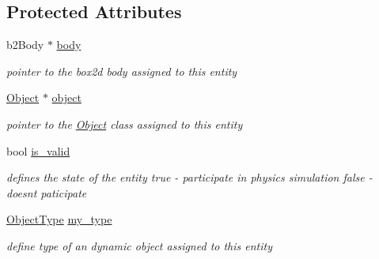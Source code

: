 \subsection*{Protected Attributes}
\begin{DoxyCompactItemize}
\item 
\mbox{\label{class_non_static_obj_a42cf308f091557d0d8a8e6ae8ee0fcf1}} 
b2\+Body $\ast$ \hyperlink{class_non_static_obj_a42cf308f091557d0d8a8e6ae8ee0fcf1}{body}
\begin{DoxyCompactList}\small\item\em pointer to the box2d body assigned to this entity \end{DoxyCompactList}\item 
\mbox{\label{class_non_static_obj_a61a8004d502132c7a13258e945300a5e}} 
\hyperlink{class_object}{Object} $\ast$ \hyperlink{class_non_static_obj_a61a8004d502132c7a13258e945300a5e}{object}
\begin{DoxyCompactList}\small\item\em pointer to the \hyperlink{class_object}{Object} class assigned to this entity \end{DoxyCompactList}\item 
\mbox{\label{class_non_static_obj_a41c92f702f36f05877e74fef1fcb3a71}} 
bool \hyperlink{class_non_static_obj_a41c92f702f36f05877e74fef1fcb3a71}{is\+\_\+valid}
\begin{DoxyCompactList}\small\item\em defines the state of the entity \textquotesingle{}true\textquotesingle{} -\/ participate in physics simulation \textquotesingle{}false\textquotesingle{} -\/ doesn\textquotesingle{}t paticipate \end{DoxyCompactList}\item 
\mbox{\label{class_non_static_obj_a4328e86d88a94270b88acb0d3965112b}} 
\hyperlink{_non_static_obj_8h_a842c5e2e69277690b064bf363c017980}{Object\+Type} \hyperlink{class_non_static_obj_a4328e86d88a94270b88acb0d3965112b}{my\+\_\+type}
\begin{DoxyCompactList}\small\item\em define type of an dynamic object assigned to this entity \end{DoxyCompactList}\end{DoxyCompactItemize}


